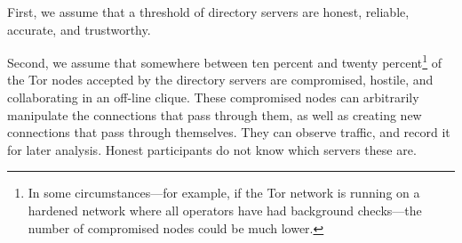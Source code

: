 \documentclass[times,10pt,twocolumn]{article}
\begin{document}
%

First, we assume that a threshold of directory servers are honest,
reliable, accurate, and trustworthy.

Second, we assume that somewhere between ten percent and twenty
percent\footnote{In some circumstances---for example, if the Tor network is
  running on a hardened network where all operators have had background
  checks---the number of compromised nodes could be much lower.} 
of the Tor nodes accepted by the directory servers are compromised, hostile,
and collaborating in an off-line clique.  These compromised nodes can
arbitrarily manipulate the connections that pass through them, as well as
creating new connections that pass through themselves.  They can observe
traffic, and record it for later analysis.  Honest participants do not know
which servers these are.
\end{document}
